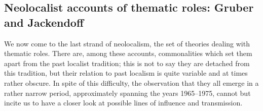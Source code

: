 \documentclass[output=paper]{langscibook}
\begin{document}
\subsection{ Neolocalist accounts of thematic roles: Gruber and Jackendoff}

We now come to the last strand of neolocalism, the set of theories dealing with thematic roles. There are, among these accounts, commonalities which set them apart from the past localist tradition; this is not to say they are detached from this tradition, but their relation to past localism is quite variable and at times rather obscure. In spite of this difficulty, the observation that they all emerge in a rather narrow period, approximately spanning the years 1965--1975, cannot but incite us to have a closer look at possible lines of influence and transmission.
\end{document}
